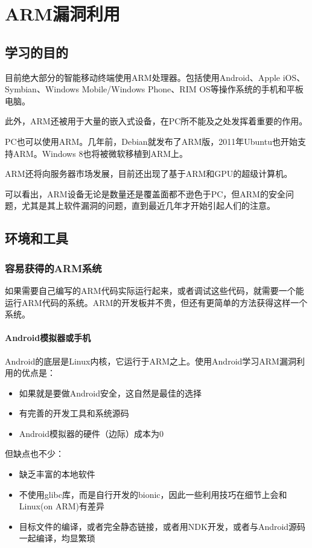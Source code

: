 \chapter{ARM漏洞利用}
\section{学习的目的}
目前绝大部分的智能移动终端使用ARM处理器。包括使用Android、Apple iOS、Symbian、Windows Mobile/Windows Phone、RIM OS等操作系统的手机和平板电脑。

此外，ARM还被用于大量的嵌入式设备，在PC所不能及之处发挥着重要的作用。

PC也可以使用ARM。几年前，Debian就发布了ARM版，2011年Ubuntu也开始支持ARM。Windows 8也将被微软移植到ARM上。

ARM还将向服务器市场发展，目前还出现了基于ARM和GPU的超级计算机。

可以看出，ARM设备无论是数量还是覆盖面都不逊色于PC，但ARM的安全问题，尤其是其上软件漏洞的问题，直到最近几年才开始引起人们的注意。
\section{环境和工具}
\subsection{容易获得的ARM系统}
如果需要自己编写的ARM代码实际运行起来，或者调试这些代码，就需要一个能运行ARM代码的系统。ARM的开发板并不贵，但还有更简单的方法获得这样一个系统。
\subsubsection{Android模拟器或手机}
Android的底层是Linux内核，它运行于ARM之上。使用Android学习ARM漏洞利用的优点是：
\begin{itemize}
\item 如果就是要做Android安全，这自然是最佳的选择
\item 有完善的开发工具和系统源码
\item Android模拟器的硬件（边际）成本为0
\end{itemize}
但缺点也不少：
\begin{itemize}
\item 缺乏丰富的本地软件
\item 不使用glibc库，而是自行开发的bionic，因此一些利用技巧在细节上会和Linux(on ARM)有差异
\item 目标文件的编译，或者完全静态链接，或者用NDK开发，或者与Android源码一起编译，均显繁琐
\end{itemize}

